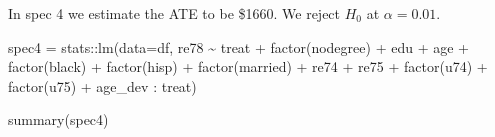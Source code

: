 \documentclass[
]{article}
\newenvironment{Shaded}{\begin{snugshade}}{\end{snugshade}}
\newcommand{\AttributeTok}[1]{\textcolor[rgb]{0.77,0.63,0.00}{#1}}
\newcommand{\FunctionTok}[1]{\textcolor[rgb]{0.00,0.00,0.00}{#1}}
\newcommand{\NormalTok}[1]{#1}
\newcommand{\OtherTok}[1]{\textcolor[rgb]{0.56,0.35,0.01}{#1}}
\newcommand{\SpecialCharTok}[1]{\textcolor[rgb]{0.00,0.00,0.00}{#1}}
\begin{document}
In spec 4 we estimate the ATE to be \$1660. We reject \(H_0\) at
\(\alpha = 0.01\).

\begin{Shaded}
\end{Shaded}

\begin{Shaded}
\begin{Highlighting}[]
\NormalTok{spec4 }\OtherTok{=}\NormalTok{ stats}\SpecialCharTok{::}\FunctionTok{lm}\NormalTok{(}\AttributeTok{data=}\NormalTok{df, re78 }\SpecialCharTok{\textasciitilde{}}\NormalTok{ treat }\SpecialCharTok{+} \FunctionTok{factor}\NormalTok{(nodegree) }\SpecialCharTok{+}\NormalTok{ edu }\SpecialCharTok{+}\NormalTok{ age}
                  \SpecialCharTok{+} \FunctionTok{factor}\NormalTok{(black) }\SpecialCharTok{+} \FunctionTok{factor}\NormalTok{(hisp) }\SpecialCharTok{+} \FunctionTok{factor}\NormalTok{(married) }\SpecialCharTok{+}\NormalTok{ re74 }
                  \SpecialCharTok{+}\NormalTok{ re75 }\SpecialCharTok{+} \FunctionTok{factor}\NormalTok{(u74) }\SpecialCharTok{+} \FunctionTok{factor}\NormalTok{(u75) }\SpecialCharTok{+}\NormalTok{ age\_dev }\SpecialCharTok{:}\NormalTok{ treat)}

\FunctionTok{summary}\NormalTok{(spec4)}
\end{Highlighting}
\end{Shaded}
\end{document}
